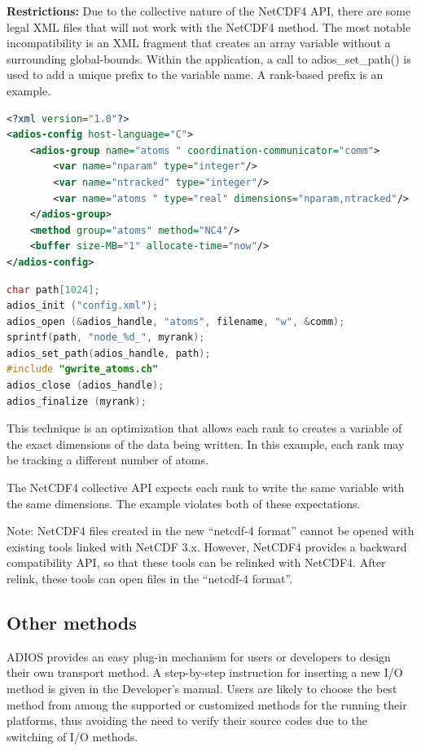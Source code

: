 \textbf{Restrictions:} Due to the collective nature of the NetCDF4 API, there are 
some legal XML files that will not work with the NetCDF4 method.  The most notable 
incompatibility is an XML fragment that creates an array variable without a surrounding 
global-bounds.  Within the application, a call to adios\_set\_path() is used to 
add a unique prefix to the variable name.  A rank-based prefix is an example. 

\begin{lstlisting}[language=XML, caption=Example XML]
<?xml version="1.0"?> 
<adios-config host-language="C">
	<adios-group name="atoms " coordination-communicator="comm"> 
		<var name="nparam" type="integer"/>
		<var name="ntracked" type="integer"/>
		<var name="atoms " type="real" dimensions="nparam,ntracked"/> 
	</adios-group>
	<method group="atoms" method="NC4"/> 
	<buffer size-MB="1" allocate-time="now"/> 
</adios-config>
\end{lstlisting}

\begin{lstlisting}[language=C, caption=Example C source]
char path[1024];
adios_init ("config.xml");
adios_open (&adios_handle, "atoms", filename, "w", &comm); 
sprintf(path, "node_%d_", myrank); 
adios_set_path(adios_handle, path);
#include "gwrite_atoms.ch" 
adios_close (adios_handle); 
adios_finalize (myrank);
\end{lstlisting}

This technique is an optimization that allows each rank to creates a variable of 
the exact dimensions of the data being written.  In this example, each rank may 
be tracking a different number of atoms.

The NetCDF4 collective API expects each rank to write the same variable with the 
same dimensions.  The example violates both of these expectations.

Note: NetCDF4 files created in the new ``netcdf-4 format'' cannot be opened with 
existing tools linked with NetCDF 3.x.  However, NetCDF4 provides a backward compatibility 
API, so that these tools can be relinked with NetCDF4.  After relink, these tools 
can open files in the ``netcdf-4 format''.

\subsection{Other methods}

ADIOS provides an easy plug-in mechanism for users or developers to design their 
own transport method. A step-by-step instruction for inserting a new I/O method 
is given in the Developer's manual. Users are likely to choose the best method from among 
the supported or customized methods for the running their platforms, thus avoiding 
the need to verify their source codes due to the switching of I/O methods.

